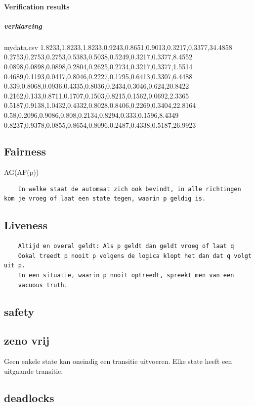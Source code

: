  
\paragraph{Verification results}


 
 
 
 
\subparagraph{verklareing}


\begin{filecontents*}{mydata.csv}
	1.8233,1.8233,1.8233,0.9243,0.8651,0.9013,0.3217,0.3377,34.4858
	0.2753,0.2753,0.2753,0.5383,0.5038,0.5249,0.3217,0.3377,8.4552
	0.0898,0.0898,0.0898,0.2804,0.2625,0.2734,0.3217,0.3377,1.5514
	0.4689,0.1193,0.0417,0.8046,0.2227,0.1795,0.6413,0.3307,6.4488
	0.339,0.8068,0.0936,0.4335,0.8036,0.2434,0.3046,0.624,20.8422
	0.2162,0.133,0.8711,0.1707,0.1503,0.8215,0.1562,0.0692,2.3365
	0.5187,0.9138,1.0432,0.4332,0.8028,0.8406,0.2269,0.3404,22.8164
	0.58,0.2096,0.9086,0.808,0.2134,0.8294,0.333,0.1596,8.4349
	0.8237,0.9378,0.0855,0.8654,0.8096,0.2487,0.4338,0.5187,26.9923 
\end{filecontents*}

\subsection{Fairness}
AG(AF(p))
\begin{verbatim}
	In welke staat de automaat zich ook bevindt, in alle richtingen kom je vroeg of laat een state tegen, waarin p geldig is.
\end{verbatim}
\subsection{Liveness}
\begin{verbatim}
	Altijd en overal geldt: Als p geldt dan geldt vroeg of laat q
	Ookal treedt p nooit p volgens de logica klopt het dan dat q volgt uit p.
	In een situatie, waarin p nooit optreedt, spreekt men van een
	vacuous truth.
\end{verbatim}

 

\subsection{safety}

\subsection{zeno vrij}
Geen enkele state kan oneindig een transitie uitvoeren. Elke state heeft een uitgaande transitie.

\subsection{deadlocks}





 





